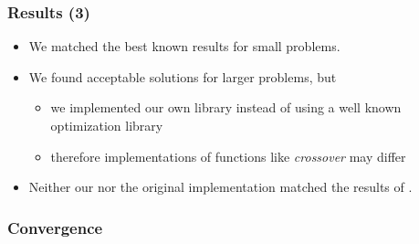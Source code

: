 \begin{frame}
	\frametitle{Results (3)}
\begin{itemize}

	\item 	We matched the best known results for small problems.

	\item 	We found acceptable solutions for larger problems, but
		\begin{itemize}
			\item 		we implemented our own library instead of using a well known optimization library
			\item 		therefore implementations of functions like \emph{crossover} may differ
		\end{itemize}
		

	\item 	Neither our nor the original implementation matched the results of \cite[PSO'08]{PSO}.
\end{itemize}

	
\end{frame}


\begin{frame}
  \frametitle{Convergence}
\end{frame}

